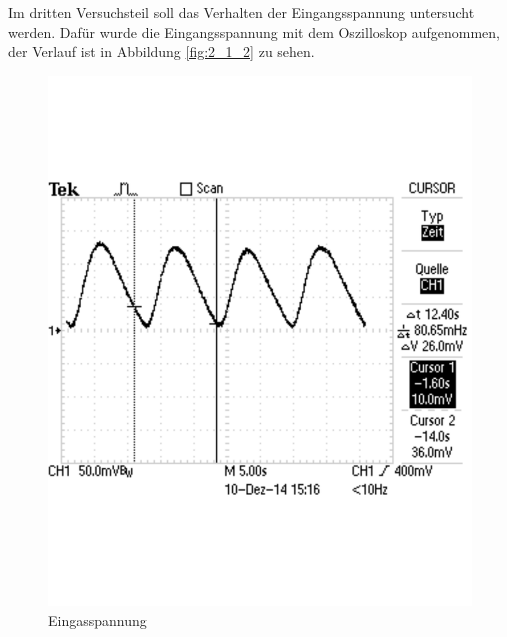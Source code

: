 \documentclass[12pt,a4paper]{article}
\begin{document}
Im dritten Versuchsteil soll das Verhalten der Eingangsspannung untersucht werden. Dafür wurde die Eingangsspannung mit dem Oszilloskop aufgenommen, der Verlauf ist in Abbildung \ref{fig:2_1_2} zu sehen.

\begin{figure}[H] 
  \centering
    \includegraphics[trim = 0mm 50mm 0mm 50mm, clip, scale = 0.6]{2_1_2.pdf}
  	\caption[Eingasspannung]{Eingasspannung}
  \label{fig:2_1}
\end{figure}
\end{document}
